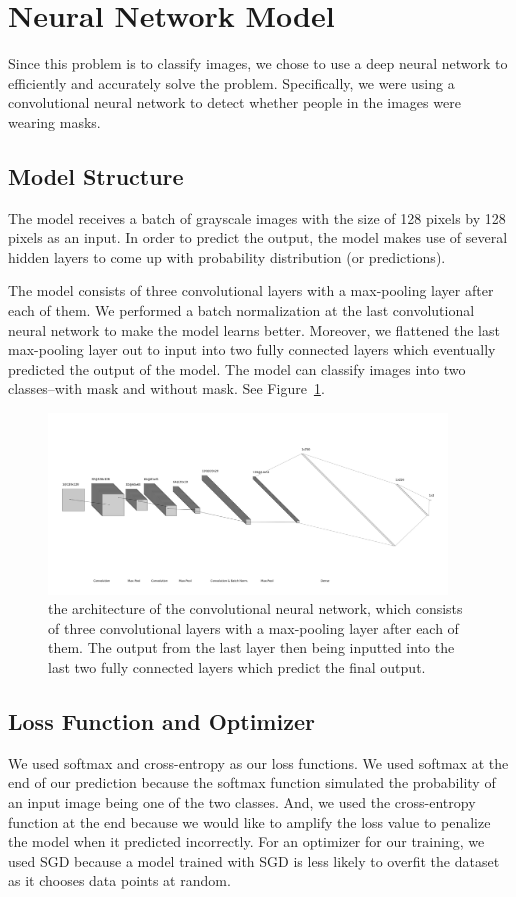 \section{Neural Network Model}

Since this problem is to classify images, we chose to use a deep neural network to efficiently and accurately solve the problem.
Specifically, we were using a convolutional neural network to detect whether people in the images were wearing masks.

\subsection{Model Structure}

The model receives a batch of grayscale images with the size of 128 pixels by 128 pixels as an input.
In order to predict the output, the model makes use of several hidden layers to come up with probability distribution (or predictions).

The model consists of three convolutional layers with a max-pooling layer after each of them.
We performed a batch normalization at the last convolutional neural network to make the model learns better. 
Moreover, we flattened the last max-pooling layer out to input into two fully connected layers which eventually predicted the output of the model.
The model can classify images into two classes–with mask and without mask. See Figure~\ref{fig:model-structure}.

\begin{figure}
  \caption{
    the architecture of the convolutional neural network,
    which consists of three convolutional layers with a max-pooling layer after each of them.
    The output from the last layer then being inputted into the last two fully connected layers which predict the final output.
  }
  \label{fig:model-structure}
  \centering
  \includegraphics[width=400px]{figures/model-structure.jpg}
\end{figure}


\subsection{Loss Function and Optimizer}

We used softmax and cross-entropy as our loss functions.
We used softmax at the end of our prediction because the softmax function simulated the probability of an input image being one of the two classes.
And, we used the cross-entropy function at the end because we would like to amplify the loss value to penalize the model when it predicted incorrectly.
For an optimizer for our training, we used SGD because a model trained with SGD is less likely to overfit the dataset as it chooses data points at random.
